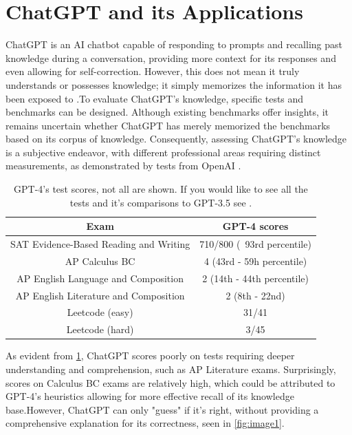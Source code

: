 \documentclass[letterpaper, 10pt, conference]{ieeeconf}
\begin{document}
   \section{ChatGPT and its Applications}
   ChatGPT is an AI chatbot capable of responding to prompts and recalling past knowledge during a conversation, providing more context for its responses and even allowing for self-correction. However, this does not mean it truly understands or possesses knowledge; it simply memorizes the information it has been exposed to \cite{bubeck2023sparks}.To evaluate ChatGPT's knowledge, specific tests and benchmarks can be designed. Although existing benchmarks offer insights, it remains uncertain whether ChatGPT has merely memorized the benchmarks based on its corpus of knowledge. Consequently, assessing ChatGPT's knowledge is a subjective endeavor, with different professional areas requiring distinct measurements, as demonstrated by tests from OpenAI \cite{openai2023gpt4}.\newline

   \begin{table}
       \centering
       \caption{GPT-4's test scores, not all are shown. If you would like to see all the tests and it's comparisons to GPT-3.5 see \cite{openai2023gpt4}.}
       \label{tab:table1}
       \begin{tabular}{c|c}
        Exam & GPT-4 scores\\
        \hline
        SAT Evidence-Based Reading and Writing & 710/800 (~93rd percentile)\\
        AP Calculus BC & 4 (43rd - 59h percentile)\\
        AP English Language and Composition & 2 (14th - 44th percentile)\\
        AP English Literature and Composition & 2 (8th - 22nd)\\
        Leetcode (easy) & 31/41 \\
        Leetcode (hard) & 3/45 \\
        \hline
    
       \end{tabular}

   \end{table}

   As evident from \ref{tab:table1}, ChatGPT scores poorly on tests requiring deeper understanding and comprehension, such as AP Literature exams. Surprisingly, scores on Calculus BC exams are relatively high, which could be attributed to GPT-4's heuristics allowing for more effective recall of its knowledge base\cite{bubeck2023sparks}.However, ChatGPT can only "guess" if it's right, without providing a comprehensive explanation for its correctness, seen in \ref{fig:image1}.\newline 
\end{document}
